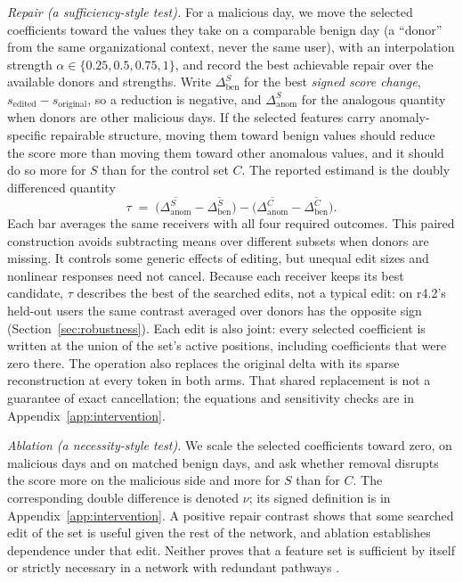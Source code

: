 \documentclass[10pt]{article} %
\begin{document}
\emph{Repair (a sufficiency-style test).} For a malicious day, we move
the selected coefficients toward the values they take on a comparable
benign day (a ``donor'' from the same organizational context, never the
same user), with an interpolation strength
$\alpha \in \{0.25, 0.5, 0.75, 1\}$, and record the best achievable
repair over the available donors and strengths. Write
$\Delta^{S}_{\mathrm{ben}}$ for the best \emph{signed score change},
$s_{\mathrm{edited}}-s_{\mathrm{original}}$, so a reduction is negative, and
$\Delta^{S}_{\mathrm{anom}}$ for the analogous quantity when donors are
other malicious days. If the selected features carry anomaly-specific
repairable structure, moving them toward benign values should reduce
the score more than moving them toward other anomalous values, and it
should do so more for $S$ than for the control set $C$. The reported
estimand is the doubly differenced quantity
\begin{equation}
\tau \;=\; \bigl(\overline{\Delta^{S}_{\mathrm{anom}}} -
\overline{\Delta^{S}_{\mathrm{ben}}}\bigr) -
\bigl(\overline{\Delta^{C}_{\mathrm{anom}}} -
\overline{\Delta^{C}_{\mathrm{ben}}}\bigr).
\end{equation}
Each bar averages the same receivers with all four required outcomes.
This paired construction avoids subtracting means over different subsets
when donors are missing. It controls some generic effects of editing,
but unequal edit sizes and nonlinear responses need not cancel. Because each
receiver keeps its best candidate, $\tau$ describes the best of the searched
edits, not a typical edit: on r4.2's held-out users the same contrast averaged
over donors has the opposite sign (Section~\ref{sec:robustness}). Each edit is
also joint: every selected coefficient is written at the union of the set's
active positions, including coefficients that were zero there.
The operation also replaces the original delta with its sparse
reconstruction at every token in both arms. That shared replacement
is not a guarantee of exact cancellation; the equations and sensitivity
checks are in Appendix~\ref{app:intervention}.

\emph{Ablation (a necessity-style test).} We scale the selected
coefficients toward zero, on malicious days and on matched benign days,
and ask whether removal disrupts the score more on the malicious side
and more for $S$ than for $C$. The corresponding double difference is
denoted $\nu$; its signed definition is in Appendix~\ref{app:intervention}.
A positive repair contrast shows that some searched edit of the set is
useful given the rest of the network, and ablation establishes dependence
under that edit. Neither
proves that a feature set is sufficient by itself or strictly necessary
in a network with redundant pathways \citep{heimersheim2024use,zhang2023best}.
\end{document}

